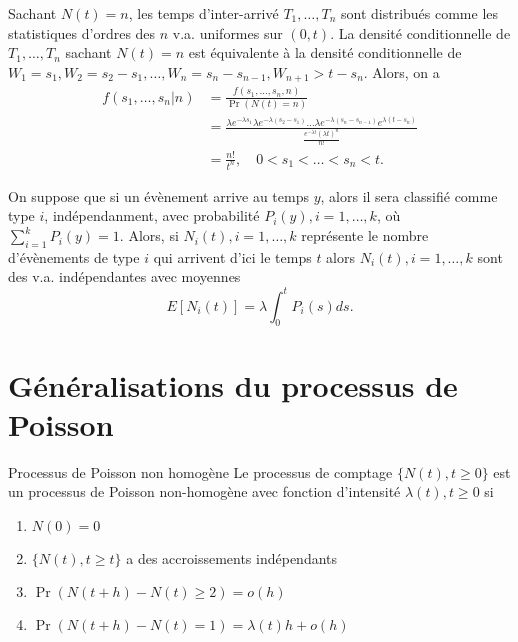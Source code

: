 \begin{theoreme}{}{}
	Sachant $N(t) = n$, les temps d'inter-arrivé $T_1, \dots, T_n$ sont distribués comme les statistiques d'ordres des $n$ v.a. uniformes sur $(0, t)$.
	\tcblower
	La densité conditionnelle de $T_1, \dots, T_n$ sachant $N(t) = n$ est équivalente à la densité conditionnelle de $W_1 = s_1, W_2 = s_2 - s_1, \dots, W_n = s_n - s_{n-1}, W_{n+1} > t - s_n$. Alors, on a 
	\begin{align*}
	f(s_1, \dots, s_n \vert n) &= \frac{f(s_1, \dots, s_n, n)}{\Pr(N(t) = n)}\\
	&= \frac{\lambda e^{-\lambda s_1} \lambda e^{-\lambda(s_2 - s_1)} \dots \lambda e^{-\lambda (s_n - s_{n-1})} e^{\lambda(t-s_n)}}{\frac{e^{-\lambda t}(\lambda t)^n}{n!}}\\
	&= \frac{n!}{t^n}, \quad 0<s_1<\dots <s_n<t.
	\end{align*}
\end{theoreme}

\begin{proposition}{}{}
	On suppose que si un évènement arrive au temps $y$, alors il sera classifié comme type $i$, indépendanment, avec probabilité $P_i(y), i = 1, \dots, k$, où $\sum_{i = 1}^{k}P_i(y) = 1.$ Alors, si $N_i(t), i = 1, \dots, k$ représente le nombre d'évènements de type $i$ qui arrivent d'ici le temps $t$ alors $N_i(t), i = 1, \dots, k$ sont des v.a. indépendantes avec moyennes 
	$$E[N_i(t)] = \lambda \int_{0}^{t}P_i(s) ds. $$
\end{proposition}

\section{Généralisations du processus de Poisson}

\begin{definition}{Processus de Poisson non homogène}{}
	Le processus de comptage $\{N(t), t\geq 0\}$ est un processus de Poisson non-homogène avec fonction d'intensité $\lambda(t), t\geq 0$ si 
	\begin{enumerate}
		\item $\displaystyle N(0) = 0$
		\item $\displaystyle \{N(t), t\geq t\}$ a des accroissements indépendants
		\item $\displaystyle \Pr(N(t + h) - N(t) \geq 2) = o(h)$
		\item $\displaystyle \Pr(N(t + h) - N(t) = 1) = \lambda(t) h + o(h)$
	\end{enumerate}
\end{definition}

